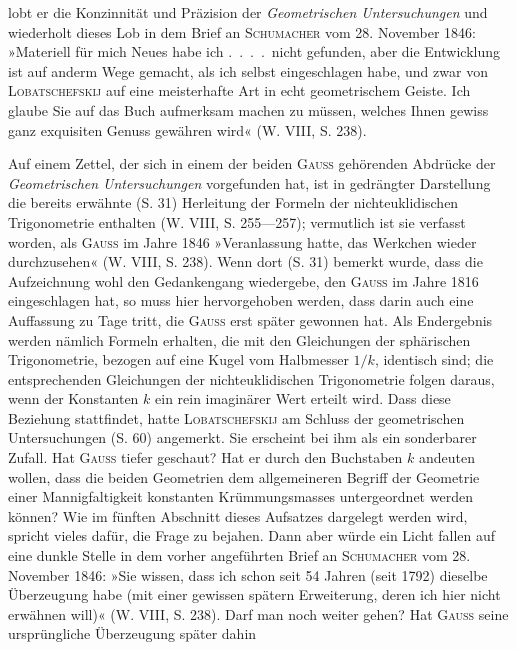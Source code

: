 lobt er die Konzinnität und Präzision der \textit{Geometrischen Untersuchungen} und
wiederholt dieses Lob in dem Brief an \textsc{Schumacher} vom 28. November 1846:
»Materiell für mich Neues habe ich .\ .\ .\ .\ nicht gefunden, aber die Entwicklung
ist auf anderm Wege gemacht, als ich selbst eingeschlagen habe,
und zwar von \textsc{Lobatschefskij} auf eine meisterhafte Art in echt geometrischem
Geiste. Ich glaube Sie auf das Buch aufmerksam machen zu müssen, welches
Ihnen gewiss ganz exquisiten Genuss gewähren wird« (W. VIII, S. 238).
\par
Auf einem Zettel, der sich in einem der beiden \textsc{Gauss} gehörenden Abdrücke
der \textit{Geometrischen Untersuchungen} vorgefunden hat, ist in gedrängter
Darstellung die bereits erwähnte (S. 31) Herleitung der Formeln der nichteuklidischen
Trigonometrie enthalten (W. VIII, S. 255—257); vermutlich ist
sie verfasst worden, als \textsc{Gauss} im Jahre 1846 »Veranlassung hatte, das Werkchen
wieder durchzusehen« (W. VIII, S. 238). Wenn dort (S. 31) bemerkt
wurde, dass die Aufzeichnung wohl den Gedankengang wiedergebe, den \textsc{Gauss}
im Jahre 1816 eingeschlagen hat, so muss hier hervorgehoben werden, dass
darin auch eine Auffassung zu Tage tritt, die \textsc{Gauss} erst später gewonnen hat.
Als Endergebnis werden nämlich Formeln erhalten, die mit den Gleichungen
der sphärischen Trigonometrie, bezogen auf eine Kugel vom Halbmesser \(1/k\),
identisch sind; die entsprechenden Gleichungen der nichteuklidischen Trigonometrie
folgen daraus, wenn der Konstanten \(k\) ein rein imaginärer Wert erteilt
wird. Dass diese Beziehung stattfindet, hatte \textsc{Lobatschefskij} am Schluss der
geometrischen Untersuchungen (S. 60) angemerkt. Sie erscheint bei ihm als
ein sonderbarer Zufall. Hat \textsc{Gauss} tiefer geschaut? Hat er durch den Buchstaben
\(k\) andeuten wollen, dass die beiden Geometrien dem allgemeineren
Begriff der Geometrie einer Mannigfaltigkeit konstanten Krümmungsmasses
untergeordnet werden können? Wie im fünften Abschnitt dieses Aufsatzes
\clearpage{}\setcounter{footnote}{0}
\noindent dargelegt werden wird, spricht vieles dafür, die Frage zu bejahen. Dann aber
würde ein Licht fallen auf eine dunkle Stelle in dem vorher angeführten Brief
an \textsc{Schumacher} vom 28. November 1846: »Sie wissen, dass ich schon seit 54
Jahren (seit 1792) dieselbe Überzeugung habe (mit einer gewissen spätern Erweiterung,
deren ich hier nicht erwähnen will)« (W. VIII, S. 238). Darf man
noch weiter gehen? Hat \textsc{Gauss} seine ursprüngliche Überzeugung später dahin
